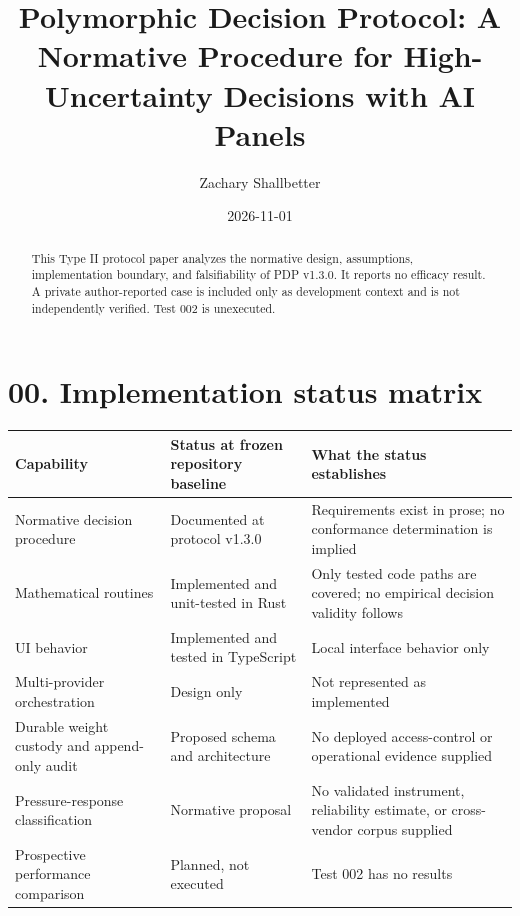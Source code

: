 \documentclass[
  english,
]{article}
\title{Polymorphic Decision Protocol: A Normative Procedure for
High-Uncertainty Decisions with AI Panels}
\author{Zachary Shallbetter}
\date{2026-11-01}
\newcounter{none} %
\begin{document}
\maketitle
\begin{abstract}
This Type II protocol paper analyzes the normative design, assumptions,
implementation boundary, and falsifiability of PDP v1.3.0. It reports no
efficacy result. A private author-reported case is included only as
development context and is not independently verified. Test 002 is
unexecuted.
\end{abstract}

{
\setcounter{tocdepth}{3}
\tableofcontents
}
\section{00. Implementation status
matrix}\label{implementation-status-matrix}

{\def\LTcaptype{none} %
\begin{longtable}[]{@{}
  >{\raggedright\arraybackslash}p{}
  >{\raggedright\arraybackslash}p{}
  >{\raggedright\arraybackslash}p{}@{}}
\toprule\noalign{}
\begin{minipage}[b]{\linewidth}\raggedright
Capability
\end{minipage} & \begin{minipage}[b]{\linewidth}\raggedright
Status at frozen repository baseline
\end{minipage} & \begin{minipage}[b]{\linewidth}\raggedright
What the status establishes
\end{minipage} \\
\midrule\noalign{}
\endhead
\bottomrule\noalign{}
\endlastfoot
Normative decision procedure & Documented at protocol v1.3.0 &
Requirements exist in prose; no conformance determination is implied \\
Mathematical routines & Implemented and unit-tested in Rust & Only
tested code paths are covered; no empirical decision validity follows \\
UI behavior & Implemented and tested in TypeScript & Local interface
behavior only \\
Multi-provider orchestration & Design only & Not represented as
implemented \\
Durable weight custody and append-only audit & Proposed schema and
architecture & No deployed access-control or operational evidence
supplied \\
Pressure-response classification & Normative proposal & No validated
instrument, reliability estimate, or cross-vendor corpus supplied \\
Prospective performance comparison & Planned, not executed & Test 002
has no results \\
\end{longtable}
}
\end{document}
